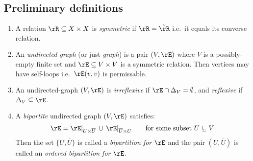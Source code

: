 \documentclass{article}
\begin{document}
\subsection{Preliminary definitions}

\begin{definition}
  \label{def:ugraphs_bipartite_ugraphs}
  \item
  \begin{enumerate}
  \item
  A relation $\rR \subseteq X \times X$ is \emph{symmetric} if $\rR = \breve{\rR}$ i.e.\ it equals its converse relation.
  \item
  An \emph{undirected graph} (or just \emph{graph}) is a pair $(V,\rE)$ where $V$ is a possibly-empty finite set and $\rE \subseteq V \times V$ is a symmetric relation. Then vertices may have self-loops i.e.\ $\rE(v,v)$ is permissable.
  
  \item
  An undirected-graph $(V,\rE)$ is \emph{irreflexive} if $\rE \cap \Delta_V = \emptyset$, and \emph{reflexive} if $\Delta_V \subseteq \rE$.

  \item
  A \emph{bipartite} undirected graph $(V,\rE)$ satisfies:
  \[
  \rE = \rE |_{U \times \overline{U}} \,\cup\, \rE |_{\overline{U} \times U}
  \qquad
  \text{for some subset $U \subseteq V$}.
  \]
  Then the set $\{ U, \overline{U} \}$ is called a \emph{bipartition for $\rE$} and the pair $(U,\overline{U})$ is called an \emph{ordered bipartition for $\rE$}. \endbox
  \end{enumerate}
\end{definition}

\smallskip
\end{document}
